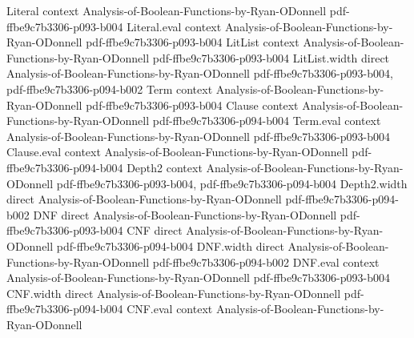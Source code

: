 \begin{theorem}
\label{thm:switching_corollary}
\proofstep
  {Literal}
  {context}
  {Analysis-of-Boolean-Functions-by-Ryan-ODonnell}
  {pdf-ffbe9c7b3306-p093-b004}
\proofstep
  {Literal.eval}
  {context}
  {Analysis-of-Boolean-Functions-by-Ryan-ODonnell}
  {pdf-ffbe9c7b3306-p093-b004}
\proofstep
  {LitList}
  {context}
  {Analysis-of-Boolean-Functions-by-Ryan-ODonnell}
  {pdf-ffbe9c7b3306-p093-b004}
\proofstep
  {LitList.width}
  {direct}
  {Analysis-of-Boolean-Functions-by-Ryan-ODonnell}
  {pdf-ffbe9c7b3306-p093-b004,
    pdf-ffbe9c7b3306-p094-b002}
\proofstep
  {Term}
  {context}
  {Analysis-of-Boolean-Functions-by-Ryan-ODonnell}
  {pdf-ffbe9c7b3306-p093-b004}
\proofstep
  {Clause}
  {context}
  {Analysis-of-Boolean-Functions-by-Ryan-ODonnell}
  {pdf-ffbe9c7b3306-p094-b004}
\proofstep
  {Term.eval}
  {context}
  {Analysis-of-Boolean-Functions-by-Ryan-ODonnell}
  {pdf-ffbe9c7b3306-p093-b004}
\proofstep
  {Clause.eval}
  {context}
  {Analysis-of-Boolean-Functions-by-Ryan-ODonnell}
  {pdf-ffbe9c7b3306-p094-b004}
\proofstep
  {Depth2}
  {context}
  {Analysis-of-Boolean-Functions-by-Ryan-ODonnell}
  {pdf-ffbe9c7b3306-p093-b004,
    pdf-ffbe9c7b3306-p094-b004}
\proofstep
  {Depth2.width}
  {direct}
  {Analysis-of-Boolean-Functions-by-Ryan-ODonnell}
  {pdf-ffbe9c7b3306-p094-b002}
\proofstep
  {DNF}
  {direct}
  {Analysis-of-Boolean-Functions-by-Ryan-ODonnell}
  {pdf-ffbe9c7b3306-p093-b004}
\proofstep
  {CNF}
  {direct}
  {Analysis-of-Boolean-Functions-by-Ryan-ODonnell}
  {pdf-ffbe9c7b3306-p094-b004}
\proofstep
  {DNF.width}
  {direct}
  {Analysis-of-Boolean-Functions-by-Ryan-ODonnell}
  {pdf-ffbe9c7b3306-p094-b002}
\proofstep
  {DNF.eval}
  {context}
  {Analysis-of-Boolean-Functions-by-Ryan-ODonnell}
  {pdf-ffbe9c7b3306-p093-b004}
\proofstep
  {CNF.width}
  {direct}
  {Analysis-of-Boolean-Functions-by-Ryan-ODonnell}
  {pdf-ffbe9c7b3306-p094-b004}
\proofstep
  {CNF.eval}
  {context}
  {Analysis-of-Boolean-Functions-by-Ryan-ODonnell}

\end{theorem}
